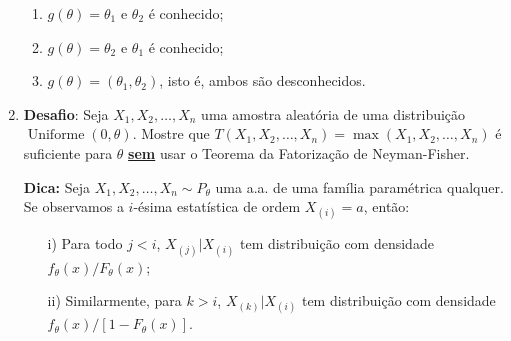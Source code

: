 \documentclass[a4paper,10pt, notitlepage]{report}
\newcommand{\rs}{X_1, X_2, \ldots, X_n} %
\begin{document}
\begin{enumerate}
    \begin{enumerate}
        \item $g(\theta) = \theta_1$ e $\theta_2$ é conhecido;
        \item $g(\theta) = \theta_2$ e $\theta_1$ é conhecido;
        \item $g(\theta) = (\theta_1, \theta_2)$, isto é, ambos são desconhecidos.
    \end{enumerate}
    \item \textbf{Desafio}: Seja $\rs$ uma amostra aleatória de uma distribuição $\operatorname{Uniforme}(0, \theta)$. 
    Mostre que $T(\rs) = \max(\rs)$ é suficiente para $\theta$ \underline{\textbf{sem}} usar o Teorema da Fatorização de Neyman-Fisher.
    
    \textbf{Dica:} Seja $\rs \sim P_\theta$ uma a.a. de uma família paramétrica qualquer.
    Se observamos a $i$-ésima estatística de ordem $X_{(i)} = a$, então:
    \begin{itemize}
        \item[i)] Para todo $j< i$, $X_{(j)} | X_{(i)}$ tem distribuição com densidade $f_\theta(x)/F_\theta(x)$;
        \item[ii)] Similarmente, para $k > i$, $X_{(k)} | X_{(i)}$ tem distribuição com densidade $f_\theta(x)/[1-F_\theta(x)]$.
    \end{itemize}
\end{enumerate}



% 
% 
\end{document}
